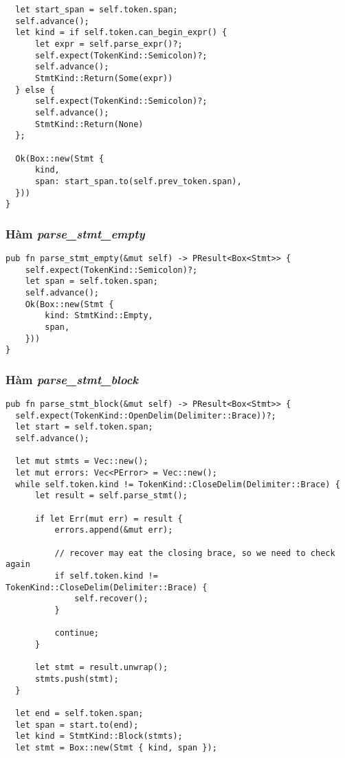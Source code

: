 {\begin{lstlisting}
  let start_span = self.token.span;
  self.advance();
  let kind = if self.token.can_begin_expr() {
      let expr = self.parse_expr()?;
      self.expect(TokenKind::Semicolon)?;
      self.advance();
      StmtKind::Return(Some(expr))
  } else {
      self.expect(TokenKind::Semicolon)?;
      self.advance();
      StmtKind::Return(None)
  };

  Ok(Box::new(Stmt {
      kind,
      span: start_span.to(self.prev_token.span),
  }))
}
\end{lstlisting}

\subsubsection{Hàm \textit{parse\_stmt\_empty}}
\label{ap1:stmt_semicolon}
\begin{lstlisting}
pub fn parse_stmt_empty(&mut self) -> PResult<Box<Stmt>> {
    self.expect(TokenKind::Semicolon)?;
    let span = self.token.span;
    self.advance();
    Ok(Box::new(Stmt {
        kind: StmtKind::Empty,
        span,
    }))
}
\end{lstlisting}

\subsubsection{Hàm \textit{parse\_stmt\_block}}
\label{ap1:stmt_block}
\begin{lstlisting}
pub fn parse_stmt_block(&mut self) -> PResult<Box<Stmt>> {
  self.expect(TokenKind::OpenDelim(Delimiter::Brace))?;
  let start = self.token.span;
  self.advance();

  let mut stmts = Vec::new();
  let mut errors: Vec<PError> = Vec::new();
  while self.token.kind != TokenKind::CloseDelim(Delimiter::Brace) {
      let result = self.parse_stmt();

      if let Err(mut err) = result {
          errors.append(&mut err);

          // recover may eat the closing brace, so we need to check again
          if self.token.kind != TokenKind::CloseDelim(Delimiter::Brace) {
              self.recover();
          }

          continue;
      }

      let stmt = result.unwrap();
      stmts.push(stmt);
  }

  let end = self.token.span;
  let span = start.to(end);
  let kind = StmtKind::Block(stmts);
  let stmt = Box::new(Stmt { kind, span });


\end{lstlisting}}
